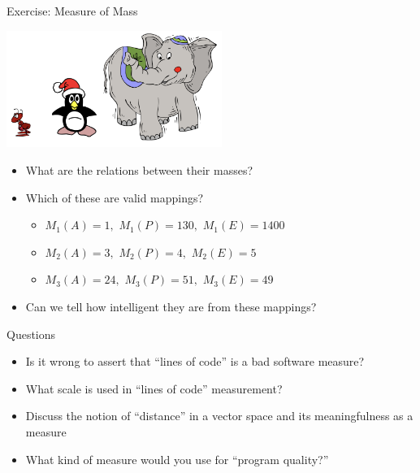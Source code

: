 \documentclass{beamer}
\begin{document}
\begin{frame}{\centerline{Exercise: Measure of Mass}}

\begin{center}
\includegraphics[width=70mm]{A2022.ScaleDeiDati/img-img18.png}
\end{center}
\begin{itemize}    
\item What are the relations between their masses?
\item Which of these are valid mappings?
\begin{itemize} 
    \item \(M_1(A)=1,\)  \(M_1(P)=130,\) \(M_1(E)=1400\)
    \item \(M_2(A)=3,\)  \(M_2(P)=4,\) \(M_2(E)=5\)
    \item \(M_3(A)=24,\) \(M_3(P)=51,\) \(M_3(E)=49\)
\end{itemize}
\item Can we tell how intelligent they are from these mappings?

\end{itemize}
\end{frame}

\begin{frame}{\centerline{Questions}}

\begin{itemize} 
\item Is it wrong to assert that ``lines of code'' is a bad software measure?
\item What scale is used in ``lines of code'' measurement?
\item Discuss the notion of ``distance'' in a vector space and its meaningfulness as a measure
\item What kind of measure would you use for ``program quality?''
\end{itemize}

\end{frame}
\end{document}
